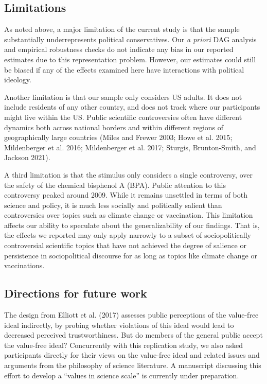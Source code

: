 \documentclass[
  letterpaper,
  DIV=11,
  numbers=noendperiod]{scrartcl}
\begin{document}
\hypertarget{limitations}{%
\subsection{Limitations}\label{limitations}}

As noted above, a major limitation of the current study is that the
sample substantially underrepresents political conservatives. Our
\emph{a priori} DAG analysis and empirical robustness checks do not
indicate any bias in our reported estimates due to this representation
problem. However, our estimates could still be biased if any of the
effects examined here have interactions with political ideology.

Another limitation is that our sample only considers US adults. It does
not include residents of any other country, and does not track where our
participants might live within the US. Public scientific controversies
often have different dynamics both across national borders and within
different regions of geographically large countries (Miles and Frewer
2003; Howe et al. 2015; Mildenberger et al. 2016; Mildenberger et al.
2017; Sturgis, Brunton-Smith, and Jackson 2021).

A third limitation is that the stimulus only considers a single
controversy, over the safety of the chemical bisphenol A (BPA). Public
attention to this controversy peaked around 2009. While it remains
unsettled in terms of both science and policy, it is much less socially
and politically salient than controversies over topics such as climate
change or vaccination. This limitation affects our ability to speculate
about the generalizability of our findings. That is, the effects we
reported may only apply narrowly to a subset of sociopolitically
controversial scientific topics that have not achieved the degree of
salience or persistence in sociopolitical discourse for as long as
topics like climate change or vaccinations.

\hypertarget{directions-for-future-work}{%
\subsection{Directions for future
work}\label{directions-for-future-work}}

The design from Elliott et al. (2017) assesses public perceptions of the
value-free ideal indirectly, by probing whether violations of this ideal
would lead to decreased perceived trustworthiness. But do members of the
general public accept the value-free ideal? Concurrently with this
replication study, we also asked participants directly for their views
on the value-free ideal and related issues and arguments from the
philosophy of science literature. A manuscript discussing this effort to
develop a ``values in science scale'' is currently under preparation.
\end{document}
